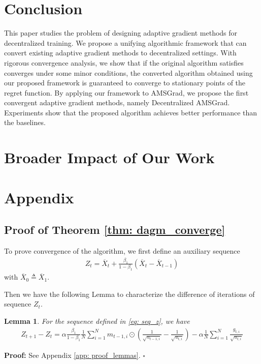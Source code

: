\documentclass{article} %
\newtheorem*{Lemma*}{Lemma}
\begin{document}
\vspace{-0.05in}
\section{Conclusion}\label{sec:conclusion}
\vspace{-0.05in}

This paper studies the problem of designing adaptive gradient methods for decentralized training. We propose a unifying algorithmic framework that can convert existing adaptive gradient methods to decentralized settings. 
With rigorous convergence analysis, we show that if the original algorithm satisfies converges under some minor conditions, the converted algorithm obtained using our proposed framework is guaranteed to converge to stationary points of the regret function. 
By applying our framework to AMSGrad, we propose the first convergent adaptive gradient methods, namely Decentralized AMSGrad. 
Experiments show that the proposed algorithm achieves better performance than the baselines. 


 

\clearpage
\section{Broader Impact of Our Work}





\appendix
\onecolumn
\section{Appendix}
\subsection{Proof of Theorem \ref{thm: dagm_converge}}\label{app: proof_thm_adm}


To prove convergence of the algorithm, we first define an auxiliary sequence 
\begin{align}\label{eq: seq_z}
Z_{t} = \overline X_t + \frac{\beta_1}{1-\beta_1} (\overline X_t - \overline X_{t-1})
\end{align}
with $\overline X_{0} \triangleq \overline X_1$.

Then we have  the following Lemma to characterize the difference of iterations of sequence $Z_t$. 
\begin{Lemma*}
	For the sequence defined in \eqref{eq: seq_z}, we have
	\begin{align}\label{eq: update_z}
	Z_{t+1} - Z_t = \alpha \frac{\beta_1}{1-\beta_1}  \frac{1}{N} \sum_{i=1}^N m_{t-1	,i} \odot (\frac{1}{\sqrt{u_{t-1,i}}} - \frac{1}{\sqrt{u_{t,i}}}) - \alpha \frac{1}{N} \sum_{i=1}^N \frac{g_{t,i}}{\sqrt{u_{t,i}}}
	\end{align}
\end{Lemma*}
\textbf{Proof:} See Appendix \ref{app: proof_lemmas}. \hfill $\square$
\end{document}
